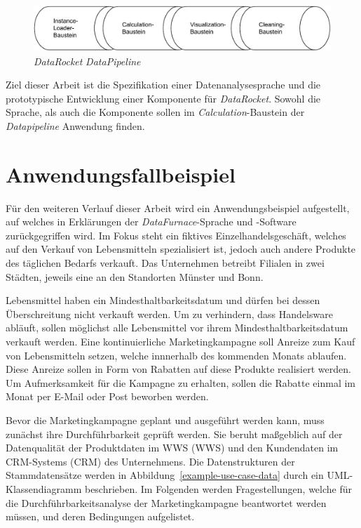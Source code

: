 \documentclass[
  language=german, %
  type=bachelor,%
  ngerman
]{isthesis}
\begin{document}
\begin{content}
  \begin{figure}
    \includegraphics[scale=0.9]{content/figures/datapipeline}
    \caption{\textit{DataRocket} \textit{DataPipeline}}\label{fig:datapipeline}
  \end{figure}


	Ziel dieser Arbeit ist die Spezifikation einer Datenanalysesprache und die
	prototypische Entwicklung einer Komponente für
	\textit{DataRocket}. Sowohl die Sprache, als auch die Komponente sollen im
	\textit{Calculation}-Baustein der \textit{Datapipeline} Anwendung finden.

  \section{Anwendungsfallbeispiel}\label{sec:anwendungsfallbeispiel}

  Für den weiteren Verlauf dieser Arbeit wird ein Anwendungsbeispiel
  aufgestellt, auf welches in Erklärungen der \textit{DataFurnace}-Sprache und
  -Software zurückgegriffen wird. Im Fokus steht ein fiktives
  Einzelhandelsgeschäft, welches auf den Verkauf von Lebensmitteln
  spezialisiert ist, jedoch auch andere Produkte des täglichen Bedarfs
  verkauft. Das Unternehmen betreibt Filialen in zwei Städten, jeweils eine an
  den Standorten Münster und Bonn.

  Lebensmittel haben ein Mindesthaltbarkeitsdatum und dürfen bei dessen
  Überschreitung nicht verkauft werden. Um zu verhindern, dass Handelsware
  abläuft, sollen möglichst alle Lebensmittel vor ihrem
  Mindesthaltbarkeitsdatum verkauft werden. Eine kontinuierliche
  Marketingkampagne soll Anreize zum Kauf von Lebensmitteln setzen, welche
  innnerhalb des kommenden Monats ablaufen. Diese Anreize sollen in Form von
  Rabatten auf diese Produkte realisiert werden. Um Aufmerksamkeit für die
  Kampagne zu erhalten, sollen die Rabatte einmal im Monat per E-Mail oder Post
  beworben werden. 

  Bevor die Marketingkampagne geplant und ausgeführt werden kann, muss zunächst
  ihre Durchführbarkeit geprüft werden. Sie beruht maßgeblich auf der
  Datenqualität der Produktdaten im \acrlong{WWS} (\acrshort{WWS}) und den
  Kundendaten im \acrlong{CRM}-Systems (\acrshort{CRM}) des Unternehmens. Die
  Datenstrukturen der Stammdatensätze werden in
  Abbildung~\ref{example-use-case-data} durch ein UML-Klassendiagramm
  beschrieben. Im Folgenden werden Fragestellungen, welche für die
  Durchführbarkeitsanalyse der Marketingkampagne beantwortet werden müssen, und
  deren Bedingungen aufgelistet.


\end{content}
\end{document}
